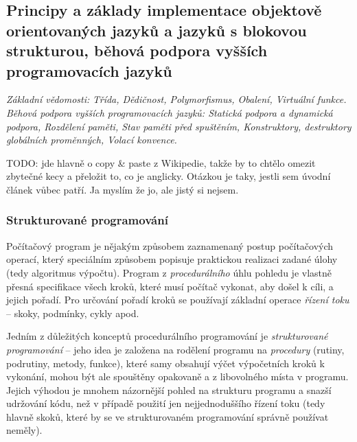\subsection{Principy a základy implementace objektově orientovaných jazyků a jazyků s blokovou strukturou, běhová podpora vyšších programovacích jazyků}

\textsl{Základní vědomosti:} \textit{ Třída, Dědičnost, Polymorfismus, Obalení, Virtuální funkce. Běhová podpora vyšších programovacích jazyků: Statická podpora a dynamická podpora, Rozdělení paměti, Stav paměti před spuštěním, Konstruktory, destruktory globálních proměnných, Volací konvence.}

TODO: jde hlavně o copy \& paste z Wikipedie, takže by to chtělo omezit zbytečné kecy a přeložit to, co je anglicky. Otázkou je taky, jestli sem úvodní článek vůbec patří. Ja myslím že jo, ale jistý si nejsem.

\subsubsection*{Strukturované programování}

Počítačový program je nějakým způsobem zaznamenaný postup počítačových operací, který speciálním způsobem popisuje praktickou realizaci zadané úlohy (tedy algoritmus výpočtu). Program z \emph{procedurálního} úhlu pohledu je vlastně přesná specifikace všech kroků, které musí počítač vykonat, aby došel k cíli, a jejich pořadí. Pro určování pořadí kroků se používají základní operace \emph{řízení toku} -- skoky, podmínky, cykly apod. 

Jedním z důležitých konceptů procedurálního programování je \emph{strukturované programování} -- jeho idea je založena na rodělení programu na \emph{procedury} (rutiny, podrutiny, metody, funkce), které samy obsahují výčet výpočetních kroků k vykonání, mohou být ale spouštěny opakovaně a z libovolného místa v programu. Jejich výhodou je mnohem názornější pohled na strukturu programu a snazší udržování kódu, než v případě použití jen nejjednoduššího řízení toku (tedy hlavně skoků, které by se ve strukturovaném programování správně používat neměly).

